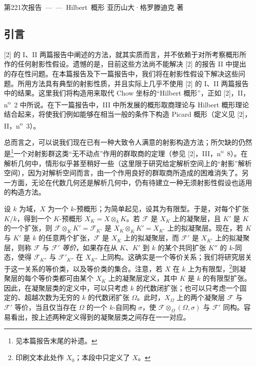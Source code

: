 \unit{第221次报告——Hilbert 概形}
%
  {亚历山大·格罗滕迪克 著}

\subsection*{引言}

[2] 的 I、II 两篇报告中阐述的方法，就其实质而言，并不依赖于对所考察概形所作的任何射影性假设。遗憾的是，目前这些方法尚不能解决 [2] 的报告 II 中提出的存在性问题。在本篇报告及下一篇报告中，我们将在射影性假设下解决这些问题。所用方法具有典型的射影性质，并且实际上几乎不使用 [2] 的 I、II 两篇报告中的结果。这里我们将构造用来取代 Chow 坐标的“Hilbert 概形”，正如 [2]，II，n\textsuperscript{o}~2 中所说。在下一篇报告中，III 中所发展的概形取商理论与 Hilbert 概形理论结合起来，将使我们例如能够在相当一般的条件下构造 Picard 概形（定义见 [2]，II，n\textsuperscript{o}~3）。

总而言之，可以说我们现在已有一种大致令人满意的射影构造方法；所欠缺的仍然是\footnote{见本篇报告末尾的补遗。}一个对射影群这类“无不动点”作用的群取商的定理（参见 [2]，III，n\textsuperscript{o}~8）。在解析几何中，情形似乎甚至稍好一些（这里限于研究给定解析空间上的“射影”解析空间），因为对解析空间而言，由一个作用良好的群取商所造成的困难消失了。另一方面，无论在代数几何还是解析几何中，仍有待建立一种无须射影性假设也适用的构造方法。


设 $k$ 为域，$X$ 为一个 $k$-预概形；为简单起见，设其为有限型。于是，对每个扩张 $K/k$，得到一个 $K$-预概形
$X_K=X\otimes_k K$。若 $\mathcal F$ 是 $X_K$ 上的凝聚层，且 $K'$ 是 $K$ 的一个扩张，则
$\mathcal F\otimes_K K'=\mathcal F_{K'}$ 是
$X_K\otimes_K K'=X_{K'}$ 上的拟凝聚层。现在，若 $K$ 与 $K'$ 是 $k$ 的任意两个扩张，$\mathcal F$ 是 $X_K$ 上的拟凝聚层，而
$\mathcal F'$
是 $X_{K'}$ 上的拟凝聚层，则称 $\mathcal F$ 与 $\mathcal F'$ \emph{等价}，如果存在从 $K$、$K'$ 到 $k$ 的某个共同扩张 $K''$ 的 $k$-同态，使得
$\mathcal F_{K''}$ 与 $\mathcal F'_{K''}$ 在 $X_{K''}$ 上同构。这确实是一个等价关系；我们将研究层关于这一关系的等价类，以及等价类的集合。注意，若 $X$ 在 $k$ 上为有限型，\footnote{印刷文本此处作 $X_0$；本段中只定义了 $X$。}则凝聚层的每个等价类都可由某个 $X_K$ 上的凝聚层定义，其中 $K$ 是 $k$ 的有限型扩张。因此，在凝聚层类的定义中，可以只考虑 $k$ 的代数闭扩张；也可以只考虑一个固定的、超越次数为无穷的 $k$ 的代数闭扩张 $\Omega$。此时，$X_\Omega$ 上的两个凝聚层 $\mathcal F$ 与 $\mathcal F'$ 等价，当且仅当存在 $\Omega$ 的一个 $k$-自同构 $\sigma$，使
$\mathcal F\otimes_\Omega(\Omega,\sigma)$ 与 $\mathcal F'$ 同构。容易看出，按上述两种定义得到的凝聚层类之间存在一一对应。

